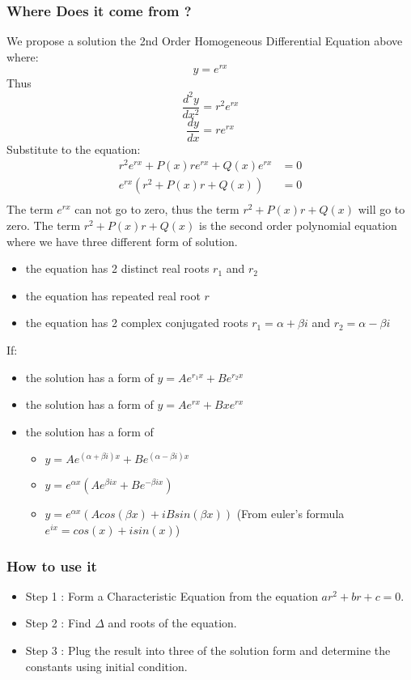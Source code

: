 \documentclass[12pt,a4paper]{article}
\begin{document}
	\subsubsection{Where Does it come from ?}
	We propose a solution the 2nd Order Homogeneous Differential Equation above where:
	\[
	y = e^{rx}
	\]
	Thus
	\[
	\frac{d^2y}{dx^2}= r^2e^{rx}
	\]
	\[
	\frac{dy}{dx} = re^{rx}
	\]
	Substitute to the equation:
	\[
	\begin{split}
		r^2e^{rx} + P(x)re^{rx} + Q(x)e^{rx} &= 0 \\
		e^{rx} (r^2 + P(x)r + Q(x)) &= 0 \\
	\end{split}
	\]
	The term $e^{rx}$ can not go to zero, thus the term $r^2 + P(x)r + Q(x)$ will go to zero. The term $r^2 + P(x)r + Q(x)$ is the second order polynomial equation where we have three different form of solution.
	\begin{itemize}
		\item { the equation has 2 distinct real roots \(r_1\) and \(r_2\)}
		\item { the equation has repeated real root \(r\)}
		\item { the equation has 2 complex conjugated roots \(r_1 = \alpha + \beta i\) and \(r_2 = \alpha - \beta i\)}
	\end{itemize}
	If:
	\begin{itemize}
		\item { the solution has a form of \(y = Ae^{r_1x} + Be^{r_2x}\)}
		\item { the solution has a form of \(y = Ae^{rx} + Bxe^{rx}\)}
		\item { the solution has a form of}
			\begin{itemize}
				\item \(y = Ae^{(\alpha + \beta i)x} + Be^{(\alpha - \beta i)x}\)
				\item \(y = e^{\alpha x}(Ae^{\beta ix} + Be^{-\beta ix})\)
				\item \(y = e^{\alpha x}(A cos (\beta x) + iB sin (\beta x))\) (From euler's formula \(e^{ix} = cos(x)+isin(x)\))
			\end{itemize}
	\end{itemize}
	
	\subsubsection{How to use it}
	\begin{itemize}
		\item Step 1 : Form a Characteristic Equation from the equation \(ar^2 + br + c =0\).
		\item Step 2 : Find \(\Delta\) and roots of the equation.
		\item Step 3 : Plug the result into three of the solution form and determine the constants using initial condition.
	\end{itemize}
	
\end{document}
